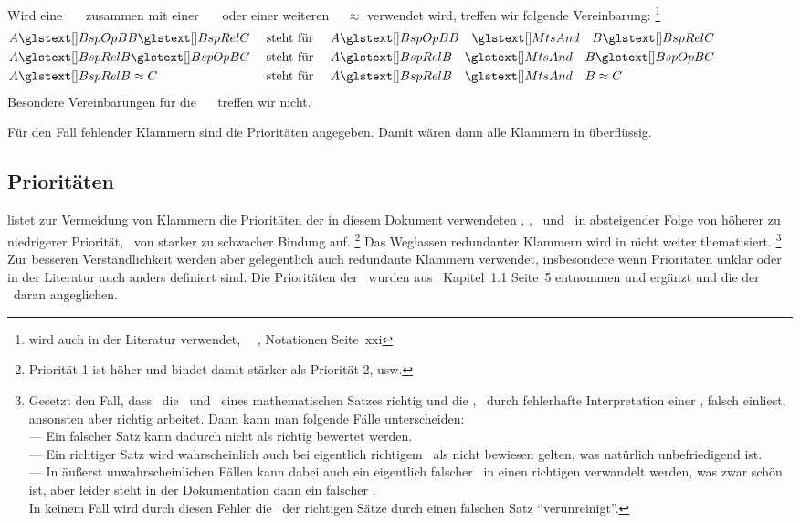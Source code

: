 %
Wird eine \binaere\ \Relation\ \BspRel\ zusammen mit einer \binaeren\ \Operation\ \BspOpB\ oder einer weiteren \binaeren\ \Relation\ $\approx$ verwendet wird, treffen wir folgende Vereinbarung:%
\footnote{%
	wird auch in der Literatur verwendet, \textzB\ \textzB~\cite{bib:Rautenberg}, Notationen Seite~xxi
}
\begin{align}
	&   A \BspOpB  B \BspRel C & \text{ steht für }
	&&& A \BspOpB  B \quad \MtsAnd \quad B \BspRel C \\
	&   A \BspRel B \BspOpB  C & \text{ steht für }
	&&& A \BspRel B \quad \MtsAnd \quad B \BspOpB  C \\
	&   A \BspRel B \approx    C & \text{ steht für }
	&&& A \BspRel B \quad \MtsAnd \quad B \approx    C \formulatoleft
\end{align}
Besondere Vereinbarungen für die \unaere\ \Operation\ \chrqt{\BspOpU} treffen wir nicht.

Für den Fall fehlender Klammern sind die Prioritäten  angegeben.
Damit wären dann alle Klammern in  überflüssig.

\subsection{Prioritäten}%
\label {sub-Prioritaeten}

 listet zur Vermeidung von Klammern die Prioritäten der in diesem Dokument verwendeten \Operationen, \Relationen, \Junktoren\ und \Definitionen\ in absteigender Folge von höherer zu niedrigerer Priorität, \textdh\ von starker zu schwacher Bindung auf.%
\footnote{Priorität 1 ist höher und bindet damit stärker als Priorität 2, usw.}
Das Weglassen redundanter Klammern wird in  nicht weiter thematisiert.%
\footnote{%
	Gesetzt den Fall, dass \ASBA\ die \Praemissen\ und \Konklusionen\ eines mathematischen Satzes richtig und die \Beweisschritte, \textzB\ durch fehlerhafte Interpretation einer \Formel, falsch einliest, ansonsten aber richtig arbeitet.
	Dann kann man folgende Fälle unterscheiden:\\
	--- Ein falscher Satz kann dadurch nicht als richtig bewertet werden.\\
	--- Ein richtiger Satz wird wahrscheinlich auch bei eigentlich richtigem \Beweis\ als nicht bewiesen gelten, was natürlich unbefriedigend ist.\\
	--- In äußerst unwahrscheinlichen Fällen kann dabei auch ein eigentlich falscher \Beweis\ in einen richtigen verwandelt werden, was zwar schön ist, aber leider steht in der Dokumentation dann ein falscher \Beweis.\\
	In keinem Fall wird durch diesen Fehler die \Menge\ der richtigen Sätze durch einen falschen Satz "`verunreinigt"'.
}
Zur besseren Verständlichkeit werden aber gelegentlich auch redundante Klammern verwendet, insbesondere wenn Prioritäten unklar oder in der Literatur auch anders definiert sind.
Die Prioritäten der \Junktoren\ wurden aus~\cite{bib:Rautenberg} Kapitel~1.1 Seite~5 entnommen und ergänzt und die der \Metaoperationen\ daran angeglichen.

